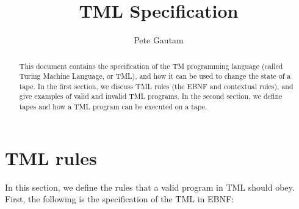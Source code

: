 \documentclass{article}
\title{TML Specification}
\author{Pete Gautam}
\theoremstyle{definition}
\begin{document}
    \maketitle
    \begin{abstract}
        This document contains the specification of the TM programming language (called Turing Machine Language, or TML), and how it can be used to change the state of a tape. In the first section, we discuss TML rules (the EBNF and contextual rules), and give examples of valid and invalid TML programs. In the second section, we define tapes and how a TML program can be executed on a tape.
    \end{abstract}

    \section{TML rules}
    In this section, we define the rules that a valid program in TML should obey. First, the following is the specification of the TML in EBNF:
\end{document}
